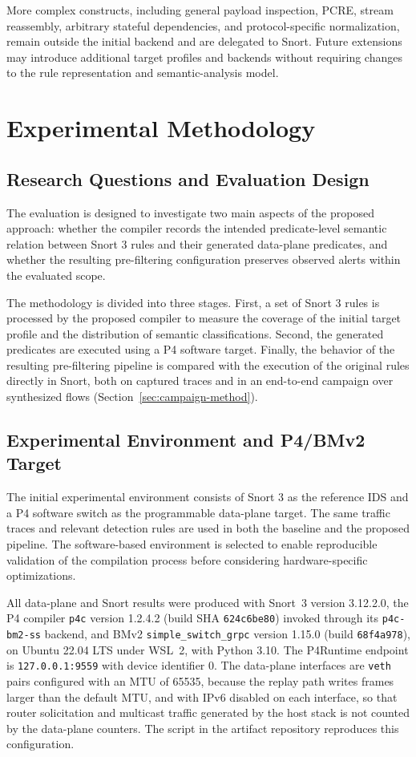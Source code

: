 \documentclass{article}
\begin{document}
More complex constructs, including general payload inspection, PCRE,
stream reassembly, arbitrary stateful dependencies, and protocol-specific
normalization, remain outside the initial backend and are delegated to
Snort. Future extensions may introduce additional target profiles and
backends without requiring changes to the rule representation and
semantic-analysis model.
\section{Experimental Methodology}
\label{sec:methodology}
\subsection{Research Questions and Evaluation Design}
The evaluation is designed to investigate two main aspects of the
proposed approach: whether the compiler records the intended
predicate-level semantic relation between Snort 3 rules and their generated
data-plane predicates, and whether the resulting pre-filtering
configuration preserves observed alerts within the evaluated scope.

The methodology is divided into three stages. First, a set of Snort 3
rules is processed by the proposed compiler to measure the coverage of
the initial target profile and the distribution of semantic
classifications. Second, the generated predicates are executed using a
P4 software target. Finally, the behavior of the resulting pre-filtering
pipeline is compared with the execution of the original rules directly
in Snort, both on captured traces and in an end-to-end campaign over
synthesized flows (Section~\ref{sec:campaign-method}).
\subsection{Experimental Environment and P4/BMv2 Target}
The initial experimental environment consists of Snort 3 as the
reference IDS and a P4 software switch as the programmable data-plane
target. The same traffic traces and relevant detection rules are used
in both the baseline and the proposed pipeline. The software-based
environment is selected to enable reproducible validation of the
compilation process before considering hardware-specific optimizations.

All data-plane and Snort results were produced with Snort~3 version 3.12.2.0, the P4
compiler \texttt{p4c} version 1.2.4.2 (build SHA \texttt{624c6be80}) invoked
through its \texttt{p4c-bm2-ss} backend, and BMv2
\texttt{simple\_switch\_grpc} version 1.15.0 (build \texttt{68f4a978}), on
Ubuntu 22.04 LTS under WSL~2, with Python 3.10. The P4Runtime endpoint is
\texttt{127.0.0.1:9559} with device identifier 0. The data-plane interfaces
are \texttt{veth} pairs configured with an MTU of 65535, because the replay
path writes frames larger than the default MTU, and with IPv6 disabled on
each interface, so that router solicitation and multicast traffic generated
by the host stack is not counted by the data-plane counters. The script
 in the artifact repository reproduces this
configuration.
\end{document}
